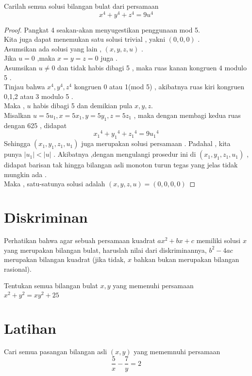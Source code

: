 \documentclass[11pt]{scrartcl}
\begin{document}
\begin{example}
    Carilah semua solusi bilangan bulat dari persamaan $$x^4+y^4+z^4=9u^4$$
\end{example}
\begin{proof}
    Pangkat 4 seakan-akan menyugestikan penggunaan mod 5. \\
    Kita juga dapat menemukan satu solusi trivial , yakni $(0,0,0)$ .\\
    Asumsikan ada solusi yang lain , $(x,y,z,u)$ .\\
    Jika $u=0$ ,maka $x=y=z=0$ juga .\\
    Asumsikan $u \neq 0$ dan tidak habis dibagi 5 , maka ruas kanan kongruen 4 modulo 5 . \\
    Tinjau bahwa $x^4,y^4,z^4$ kongruen 0 atau 1(mod 5) , akibatnya ruas kiri kongruen 0,1,2 atau 3 modulo 5 .\\
    Maka , $u$ habis dibagi 5 dan demikian pula $x,y,z$.\\
    Misalkan $u=5u_1 , x=5x_1 , y=5y_1 , z=5z_1$ , maka dengan membagi kedua ruas dengan 625 , didapat $${x_1}^4+{y_1}^4+{z_1}^4=9{u_1}^4$$
    Sehingga $(x_1,y_1,z_1,u_1)$ juga merupakan solusi persamaan . Padahal ,  kita punya $|u_1|<|u|$ . Akibatnya ,dengan mengulangi prosedur ini di $(x_1,y_1,z_1,u_1)$ , didapat barisan tak hingga bilangan asli monoton turun tegas yang jelas tidak mungkin ada . \\
    Maka , satu-satunya solusi adalah $(x,y,z,u)=(0,0,0,0)$
\end{proof}
    
\section{Diskriminan}
Perhatikan bahwa agar sebuah persamaan kuadrat $ax^2 + bx + c$ memiliki solusi $x$ yang merupakan bilangan bulat, haruslah nilai dari diskriminannya, $b^2 - 4ac$ merupakan bilangan kuadrat (jika tidak, $x$ bahkan bukan merupakan bilangan rasional). 

\begin{example}
    Tentukan semua bilangan bulat $x,y$ yang memenuhi persamaan $x^2+y^2=xy^2+25$
\end{example}
    
\section{Latihan}
\begin{problem}
    Cari semua pasangan bilangan asli $(x, y)$ yang mememnuhi persamaan $$\dfrac{5}{x} - \dfrac{7}{y} = 2$$
\end{problem}
\end{document}

